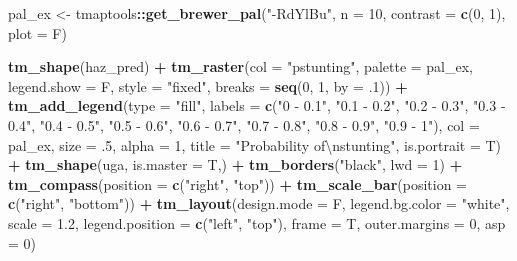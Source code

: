 \documentclass[11pt,]{article}
\newenvironment{Shaded}{\begin{snugshade}}{\end{snugshade}}
\newcommand{\CharTok}[1]{\textcolor[rgb]{0.31,0.60,0.02}{#1}}
\newcommand{\DataTypeTok}[1]{\textcolor[rgb]{0.13,0.29,0.53}{#1}}
\newcommand{\DecValTok}[1]{\textcolor[rgb]{0.00,0.00,0.81}{#1}}
\newcommand{\FloatTok}[1]{\textcolor[rgb]{0.00,0.00,0.81}{#1}}
\newcommand{\KeywordTok}[1]{\textcolor[rgb]{0.13,0.29,0.53}{\textbf{#1}}}
\newcommand{\NormalTok}[1]{#1}
\newcommand{\OperatorTok}[1]{\textcolor[rgb]{0.81,0.36,0.00}{\textbf{#1}}}
\newcommand{\StringTok}[1]{\textcolor[rgb]{0.31,0.60,0.02}{#1}}
\begin{document}
\begin{Shaded}
\begin{Highlighting}[]
\NormalTok{pal_ex <-}\StringTok{ }\NormalTok{tmaptools}\OperatorTok{::}\KeywordTok{get_brewer_pal}\NormalTok{(}\StringTok{"-RdYlBu"}\NormalTok{, }\DataTypeTok{n =} \DecValTok{10}\NormalTok{, }\DataTypeTok{contrast =} \KeywordTok{c}\NormalTok{(}\DecValTok{0}\NormalTok{, }\DecValTok{1}\NormalTok{), }\DataTypeTok{plot =}\NormalTok{ F)}

\KeywordTok{tm_shape}\NormalTok{(haz_pred) }\OperatorTok{+}
\StringTok{  }\KeywordTok{tm_raster}\NormalTok{(}\DataTypeTok{col =} \StringTok{"pstunting"}\NormalTok{, }\DataTypeTok{palette =}\NormalTok{ pal_ex, }\DataTypeTok{legend.show =}\NormalTok{ F,}
            \DataTypeTok{style =} \StringTok{"fixed"}\NormalTok{, }\DataTypeTok{breaks =} \KeywordTok{seq}\NormalTok{(}\DecValTok{0}\NormalTok{, }\DecValTok{1}\NormalTok{, }\DataTypeTok{by =} \FloatTok{.1}\NormalTok{)) }\OperatorTok{+}
\StringTok{  }\KeywordTok{tm_add_legend}\NormalTok{(}\DataTypeTok{type =} \StringTok{"fill"}\NormalTok{,}
                \DataTypeTok{labels =} \KeywordTok{c}\NormalTok{(}\StringTok{"0 - 0.1"}\NormalTok{, }\StringTok{"0.1 - 0.2"}\NormalTok{, }\StringTok{"0.2 - 0.3"}\NormalTok{, }\StringTok{"0.3 - 0.4"}\NormalTok{, }\StringTok{"0.4 - 0.5"}\NormalTok{,}
                         \StringTok{"0.5 - 0.6"}\NormalTok{, }\StringTok{"0.6 - 0.7"}\NormalTok{, }\StringTok{"0.7 - 0.8"}\NormalTok{, }\StringTok{"0.8 - 0.9"}\NormalTok{, }\StringTok{"0.9 - 1"}\NormalTok{),}
                \DataTypeTok{col =}\NormalTok{ pal_ex, }\DataTypeTok{size =} \FloatTok{.5}\NormalTok{, }\DataTypeTok{alpha =} \DecValTok{1}\NormalTok{,}
                \DataTypeTok{title =} \StringTok{"Probability of}\CharTok{\textbackslash{}n}\StringTok{stunting"}\NormalTok{,}
                \DataTypeTok{is.portrait =}\NormalTok{ T) }\OperatorTok{+}
\KeywordTok{tm_shape}\NormalTok{(uga, }\DataTypeTok{is.master =}\NormalTok{ T,) }\OperatorTok{+}
\StringTok{  }\KeywordTok{tm_borders}\NormalTok{(}\StringTok{"black"}\NormalTok{, }\DataTypeTok{lwd =} \DecValTok{1}\NormalTok{) }\OperatorTok{+}
\StringTok{  }\KeywordTok{tm_compass}\NormalTok{(}\DataTypeTok{position =} \KeywordTok{c}\NormalTok{(}\StringTok{"right"}\NormalTok{, }\StringTok{"top"}\NormalTok{)) }\OperatorTok{+}
\StringTok{  }\KeywordTok{tm_scale_bar}\NormalTok{(}\DataTypeTok{position =} \KeywordTok{c}\NormalTok{(}\StringTok{"right"}\NormalTok{, }\StringTok{"bottom"}\NormalTok{)) }\OperatorTok{+}
\StringTok{  }\KeywordTok{tm_layout}\NormalTok{(}\DataTypeTok{design.mode =}\NormalTok{ F, }\DataTypeTok{legend.bg.color =} \StringTok{"white"}\NormalTok{, }\DataTypeTok{scale =} \FloatTok{1.2}\NormalTok{,}
            \DataTypeTok{legend.position =} \KeywordTok{c}\NormalTok{(}\StringTok{"left"}\NormalTok{, }\StringTok{"top"}\NormalTok{), }\DataTypeTok{frame =}\NormalTok{ T, }\DataTypeTok{outer.margins =} \DecValTok{0}\NormalTok{, }\DataTypeTok{asp =} \DecValTok{0}\NormalTok{)}
\end{Highlighting}
\end{Shaded}
\end{document}

